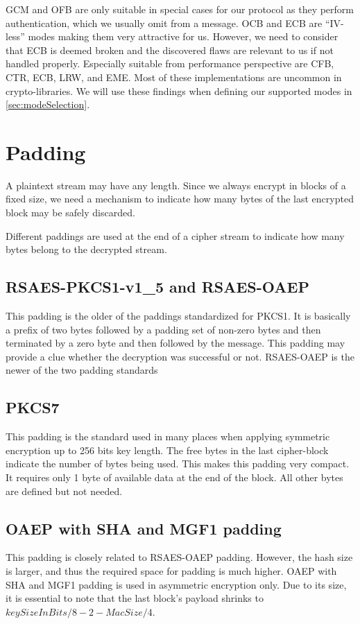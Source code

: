GCM and OFB are only suitable in special cases for our protocol as they perform authentication, which we usually omit from a message. OCB and ECB are ``IV-less'' modes making them very attractive for us. However, we need to consider that ECB is deemed broken and the discovered flaws are relevant to us if not handled properly. Especially suitable from performance perspective are CFB, CTR, ECB, LRW, and EME. Most of these implementations are uncommon in crypto-libraries. We will use these findings when defining our supported modes in \cref{sec:modeSelection}.

\section{Padding}
A plaintext stream may have any length. Since we always encrypt in blocks of a fixed size, we need a mechanism to indicate how many bytes of the last encrypted block may be safely discarded. 

Different paddings are used at the end of a cipher stream to indicate how many bytes belong to the decrypted stream.

\subsection{RSAES-PKCS1-v1\_5 and RSAES-OAEP}
This padding is the older of the paddings standardized for PKCS1. It is basically a prefix of two bytes followed by a padding set of non-zero bytes and then terminated by a zero byte and then followed by the message. This padding may provide a clue whether the decryption was successful or not. RSAES-OAEP is the newer of the two padding standards 

\subsection{PKCS7}
This padding is the standard used in many places when applying symmetric encryption up to 256 bits key length. The free bytes in the last cipher-block indicate the number of bytes being used. This makes this padding very compact. It requires only 1 byte of available data at the end of the block. All other bytes are defined but not needed.

\subsection{OAEP with SHA and MGF1 padding}
This padding is closely related to RSAES-OAEP padding. However, the hash size is larger, and thus the required space for padding is much higher. OAEP with SHA and MGF1 padding is used in asymmetric encryption only. Due to its size, it is essential to note that the last block's payload shrinks to $keySizeInBits/8-2-MacSize/4$.

